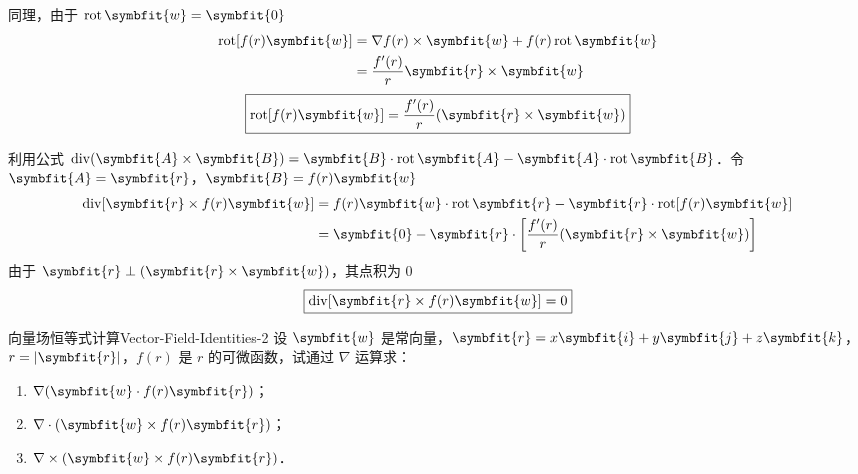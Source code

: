 \begin{solution}
    同理，由于 $\operatorname{rot} \symbfit{w} = \symbfit{0}$
    \begin{equation}
        \begin{aligned}
            \operatorname{rot} [f(r) \symbfit{w}] & = \nabla f(r) \times \symbfit{w} + f(r) \operatorname{rot} \symbfit{w} \\
                                                  & = \frac{f'(r)}{r} \symbfit{r} \times \symbfit{w}
        \end{aligned}
    \end{equation}
    \begin{equation}
        \boxed{\operatorname{rot} [f(r) \symbfit{w}] = \frac{f'(r)}{r} (\symbfit{r} \times \symbfit{w})}
    \end{equation}


    利用公式 $\operatorname{div} (\symbfit{A} \times \symbfit{B}) = \symbfit{B} \cdot \operatorname{rot} \symbfit{A} - \symbfit{A} \cdot \operatorname{rot} \symbfit{B}$．令 $\symbfit{A} = \symbfit{r}$，$\symbfit{B} = f(r) \symbfit{w}$
    \begin{equation}
        \begin{aligned}
            \operatorname{div} [\symbfit{r} \times f(r) \symbfit{w}] & = f(r) \symbfit{w} \cdot \operatorname{rot} \symbfit{r} - \symbfit{r} \cdot \operatorname{rot} [f(r) \symbfit{w}] \\
                                                                     & = \symbfit{0} - \symbfit{r} \cdot \left[ \frac{f'(r)}{r} (\symbfit{r} \times \symbfit{w}) \right]
        \end{aligned}
    \end{equation}
    由于 $\symbfit{r} \perp (\symbfit{r} \times \symbfit{w})$，其点积为 $0$
    \begin{equation}
        \boxed{\operatorname{div} [\symbfit{r} \times f(r) \symbfit{w}] = 0}
    \end{equation}
\end{solution}


\begin{problem}{向量场恒等式计算}{Vector-Field-Identities-2}
    设 $\symbfit{w}$ 是常向量，$\symbfit{r} = x\symbfit{i} + y\symbfit{j} + z\symbfit{k}$，$r = |\symbfit{r}|$，$f(r)$ 是 $r$ 的可微函数，试通过 $\nabla$ 运算求：
    \begin{enumerate}
        \item $\nabla(\symbfit{w} \cdot f(r)\symbfit{r})$；
        \item $\nabla \cdot (\symbfit{w} \times f(r)\symbfit{r})$；
        \item $\nabla \times (\symbfit{w} \times f(r)\symbfit{r})$．
    \end{enumerate}
\end{problem}

